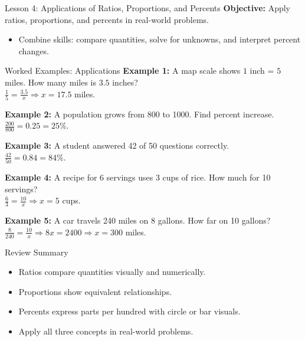 \documentclass{beamer}
\begin{document}
\begin{frame}{Lesson 4: Applications of Ratios, Proportions, and Percents}
\textbf{Objective:} Apply ratios, proportions, and percents in real-world problems.
\begin{itemize}
    \item Combine skills: compare quantities, solve for unknowns, and interpret percent changes.
\end{itemize}
\vspace{1em}
\begin{center}
\end{center}
\end{frame}

\begin{frame}{Worked Examples: Applications}
\textbf{Example 1:} A map scale shows $1$ inch = $5$ miles. How many miles is $3.5$ inches?\\
$\frac{1}{5} = \frac{3.5}{x} \Rightarrow x = 17.5$ miles.

\vspace{0.5em}
\textbf{Example 2:} A population grows from 800 to 1000. Find percent increase.\\
$\frac{200}{800} = 0.25 = 25\%$.

\vspace{0.5em}
\textbf{Example 3:} A student answered 42 of 50 questions correctly.\\
$\frac{42}{50} = 0.84 = 84\%$.

\vspace{0.5em}
\textbf{Example 4:} A recipe for 6 servings uses 3 cups of rice. How much for 10 servings?\\
$\frac{6}{3} = \frac{10}{x} \Rightarrow x = 5$ cups.

\vspace{0.5em}
\textbf{Example 5:} A car travels 240 miles on 8 gallons. How far on 10 gallons?\\
$\frac{8}{240} = \frac{10}{x} \Rightarrow 8x = 2400 \Rightarrow x = 300$ miles.
\end{frame}

\begin{frame}{Review Summary}
\begin{itemize}
    \item Ratios compare quantities visually and numerically.
    \item Proportions show equivalent relationships.
    \item Percents express parts per hundred with circle or bar visuals.
    \item Apply all three concepts in real-world problems.
\end{itemize}
\end{frame}
\end{document}
